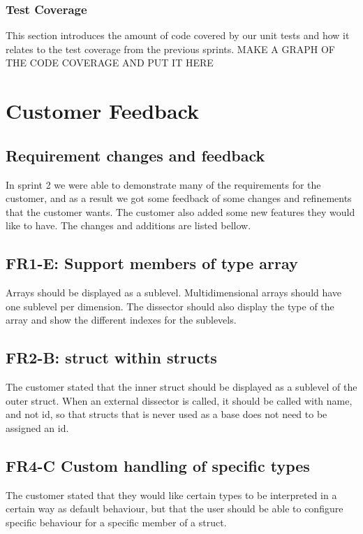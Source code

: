 \subsubsection{Test Coverage}
This section introduces the amount of code covered by our unit tests and how it relates to the test coverage from the previous sprints.
 MAKE A GRAPH OF THE CODE COVERAGE AND PUT IT HERE

 


\section{Customer Feedback}
\subsection{Requirement changes and feedback}
In sprint 2 we were able to demonstrate many of the requirements for the customer, and as a result we got some feedback of some changes and refinements that the customer wants. The customer also added some new features they would like to have. The changes and additions are listed bellow.

\subsection*{FR1-E: Support members of type array}
Arrays should be displayed as a sublevel. Multidimensional arrays should have one sublevel per dimension. The dissector should also display the type of the array and show the different indexes for the sublevels.

\subsection*{FR2-B: struct within structs}
The customer stated that the inner struct should be displayed as a sublevel of the outer struct.
When an external dissector is called, it should be called with name, and not id, so that structs that is never used as a base does not need to be assigned an id.

\subsection*{FR4-C Custom handling of specific types}
The customer stated that they would like certain types to be interpreted in a certain way as default behaviour, but that the user should be able to configure specific behaviour for a specific member of a struct.

